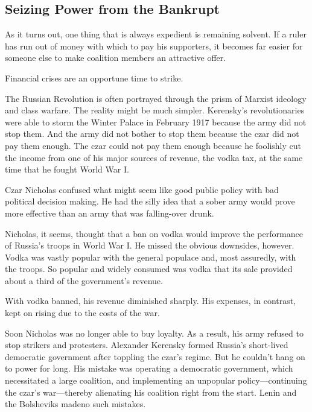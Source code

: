 \documentclass[10pt]{article}
\begin{document}
\subsection{Seizing Power from the Bankrupt}

{\large As it turns out, one thing that is always expedient is remaining
solvent. If a ruler has run out of money with which to pay his supporters, it
becomes far easier for someone else to make coalition members an attractive
offer.}

{\large Financial crises are an opportune time to strike.}

{\large The Russian Revolution is often portrayed through the prism of Marxist
ideology and class warfare. The reality might be much simpler. Kerensky's
revolutionaries were able to storm the Winter Palace in February 1917 because the
army did not stop them. And the army did not bother to stop them because the czar
did not pay them enough. The czar could not pay them enough because he foolishly
cut the income from one of his major sources of revenue, the vodka tax, at the
same time that he fought World War I.}

{\large Czar Nicholas confused what might seem like good public policy with bad
political decision making. He had the silly idea that a sober army would prove
more effective than an army that was falling-over drunk.}

{\large Nicholas, it seems, thought that a ban on vodka would improve the
performance of Russia's troops in World War I. He missed the obvious downsides,
however. Vodka was vastly popular with the general populace and, most assuredly,
with the troops. So popular and widely consumed was vodka that its sale provided
about a third of the government's revenue.}

{\large With vodka banned, his revenue diminished sharply. His expenses, in
contrast, kept on rising due to the costs of the war.}

{\large Soon Nicholas was no longer able to buy loyalty. As a result, his army
refused to stop strikers and protesters. Alexander Kerensky formed Russia's
short-lived democratic government after toppling the czar's regime. But he
couldn't hang on to power for long. His mistake was operating a democratic
government, which necessitated a large coalition, and implementing an unpopular
policy---continuing the czar's war---thereby alienating his coalition right from
the start. Lenin and the Bolsheviks madeno such mistakes.}
\end{document}
